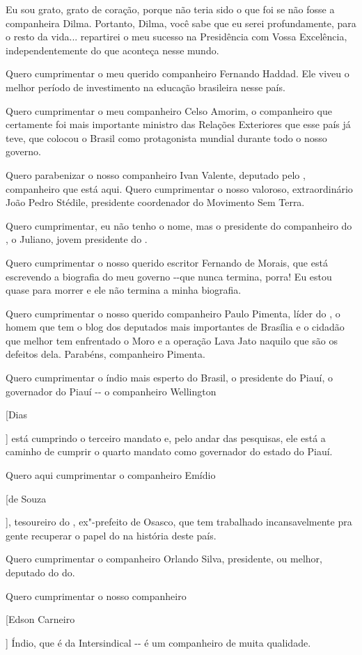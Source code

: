 {{Eu sou grato, grato de coração, porque não teria sido o que foi se
não fosse a companheira Dilma. Portanto, Dilma, você sabe que eu serei
profundamente, para o resto da vida... repartirei o meu sucesso na
Presidência com Vossa Excelência, independentemente do que aconteça
nesse mundo.

Quero cumprimentar o meu querido companheiro Fernando Haddad. Ele
viveu o melhor período de investimento na educação brasileira nesse
país.

Quero cumprimentar o meu companheiro Celso Amorim, o companheiro
que certamente foi mais importante ministro das Relações Exteriores que
esse país já teve, que colocou o Brasil como protagonista mundial
durante todo o nosso governo.

Quero parabenizar o nosso companheiro Ivan Valente, deputado pelo
, companheiro que está aqui. Quero cumprimentar o nosso valoroso,
extraordinário João Pedro Stédile, presidente coordenador do Movimento
Sem Terra.

Quero cumprimentar, eu não tenho o nome, mas o presidente do
companheiro do , o Juliano, jovem presidente do .

Quero cumprimentar o nosso querido escritor Fernando de Morais,
que está escrevendo a biografia do meu governo -\/-que nunca termina,
porra! Eu estou quase para morrer e ele não termina a minha biografia.

Quero cumprimentar o nosso querido companheiro Paulo Pimenta,
líder do , o homem que tem o blog dos deputados mais importantes de
Brasília e o cidadão que melhor tem enfrentado o Moro e a operação Lava
Jato naquilo que são os defeitos dela. Parabéns, companheiro Pimenta.

Quero cumprimentar o índio mais esperto do Brasil, o presidente do
Piauí, o governador do Piauí -\/- o companheiro Wellington {[Dias{]
está cumprindo o terceiro mandato e, pelo andar das pesquisas, ele está
a caminho de cumprir o quarto mandato como governador do estado do
Piauí.

Quero aqui cumprimentar o companheiro Emídio {[de Souza{],
tesoureiro do , ex"-prefeito de Osasco, que tem trabalhado
incansavelmente pra gente recuperar o papel do  na história deste
país.

Quero cumprimentar o companheiro Orlando Silva, presidente, ou
melhor, deputado do do.

Quero cumprimentar o nosso companheiro {[Edson Carneiro{] Índio,
que é da Intersindical -\/- é um companheiro de muita qualidade.

}}}}}}}}
